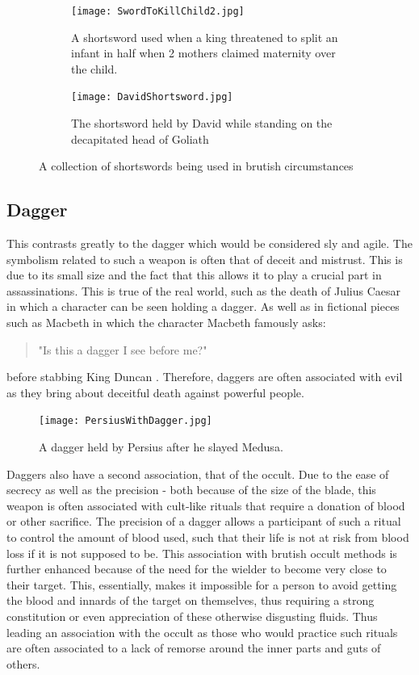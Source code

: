 \documentclass{article}
\begin{document}
\begin{figure}
    \centering
    \begin{subfigure}{0.33\textwidth}
        \texttt{[image: SwordToKillChild2.jpg]}
        \caption{A shortsword used when a king threatened to split an infant in half when 2 mothers claimed maternity over the child.}
        \label{fig:killChild}
    \end{subfigure}
    \begin{subfigure}{0.33\textwidth}
        \texttt{[image: DavidShortsword.jpg]}
        \caption{The shortsword held by David while standing on the decapitated head of Goliath}
        \label{fig:goliathDead}
    \end{subfigure}
    \caption{A collection of shortswords being used in brutish circumstances}
    \label{fig:shortswords}
\end{figure}

\subsection{Dagger} \label{daggerSymbol}
This contrasts greatly to the dagger which would be considered sly and agile. The symbolism related to such a weapon is often that of deceit and mistrust. This is due to its small size and the fact that this allows it to play a crucial part in assassinations. This is true of the real world, such as the death of Julius Caesar \parencite{caesar} in which a character can be seen holding a dagger. As well as in fictional pieces such as Macbeth in which the character Macbeth famously asks: \begin{quote}
    "Is this a dagger I see before me?"
\end{quote}
before stabbing King Duncan \parencite{macbeth}. Therefore, daggers are often associated with evil as they bring about deceitful death against powerful people.

\begin{figure}[h]
    \centering
    \texttt{[image: PersiusWithDagger.jpg]}
    \caption{A dagger held by Persius after he slayed Medusa.}
    \label{fig:PersiusDagger}
\end{figure}

Daggers also have a second association, that of the occult. Due to the ease of secrecy as well as the precision - both because of the size of the blade, this weapon is often associated with cult-like rituals that require a donation of blood or other sacrifice. The precision of a dagger allows a participant of such a ritual to control the amount of blood used, such that their life is not at risk from blood loss if it is not supposed to be. This association with brutish occult methods is further enhanced because of the need for the wielder to become very close to their target. This, essentially, makes it impossible for a person to avoid getting the blood and innards of the target on themselves, thus requiring a strong constitution or even appreciation of these otherwise disgusting fluids. Thus leading an association with the occult as those who would practice such rituals are often associated to a lack of remorse around the inner parts and guts of others.
\end{document}
